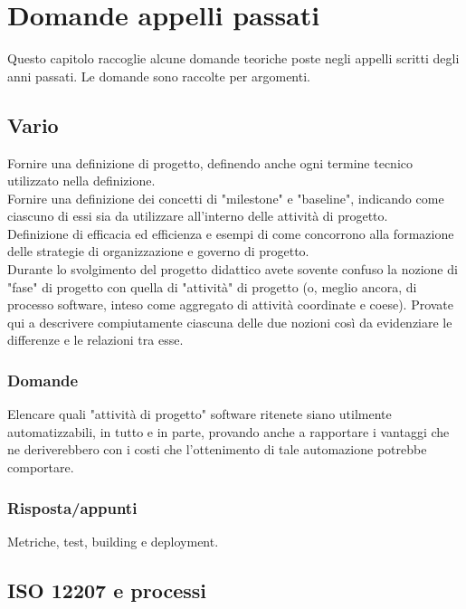 \chapter{Domande appelli passati}

Questo capitolo raccoglie alcune domande teoriche poste negli appelli scritti degli anni passati.
Le domande sono raccolte per argomenti.

\section{Vario}

Fornire una definizione di progetto, definendo anche ogni termine tecnico utilizzato nella definizione.\\

Fornire una definizione dei concetti di "milestone" e "baseline", indicando come ciascuno di essi sia da utilizzare all'interno delle attività di progetto.\\

Definizione di efficacia ed efficienza e esempi di come concorrono alla formazione delle strategie di organizzazione e governo di progetto.\\

Durante lo svolgimento del progetto didattico avete sovente confuso la nozione di "fase" di progetto con quella di "attività" di progetto (o, meglio ancora, di processo software, inteso come aggregato di attività coordinate e coese).
Provate qui a descrivere compiutamente ciascuna delle due nozioni così da evidenziare le differenze e le relazioni tra esse.\\

\subsection*{Domande}

Elencare quali "attività di progetto" software ritenete siano utilmente automatizzabili, in tutto e in parte, provando anche a rapportare i vantaggi che ne deriverebbero con i costi che l'ottenimento di tale automazione potrebbe comportare.\\

\subsection*{Risposta/appunti}
Metriche, test, building e deployment.


\section{ISO 12207 e processi}

